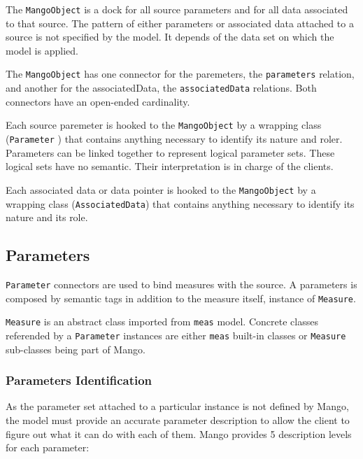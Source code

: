 \documentclass[11pt,a4paper]{ivoa}
\begin{document}
The \texttt{MangoObject} is a dock for all source parameters and for all data associated to that source.
The pattern of either parameters or associated data attached to a source is not specified by the model. It depends of the data set on which the model is applied.

The \texttt{MangoObject} has one connector for the paremeters,  the \texttt{parameters} relation, and another for the associatedData, the  \texttt{associatedData}  relations.
Both connectors have an open-ended cardinality.

Each source paremeter is hooked to the \texttt{MangoObject} by a wrapping class (\texttt{Parameter} ) that contains anything necessary to identify its nature and roler.
Parameters can be linked together to represent logical parameter sets. These logical sets have no semantic. Their interpretation is in charge  of the clients.

Each associated data or data pointer is hooked to the \texttt{MangoObject} by a wrapping class (\texttt{AssociatedData}) that contains anything necessary to identify its nature and its role.

\subsection{Parameters}

\texttt{Parameter}  connectors are used to bind measures with the source.
A parameters is composed  by semantic tags in addition to the measure itself, instance of \texttt{Measure}.

 \texttt{Measure} is an abstract class imported from \texttt{meas} model. 
Concrete classes referended by a \texttt{Parameter} instances are either \texttt{meas}  built-in classes or  \texttt{Measure} sub-classes being part of Mango.

\subsubsection{Parameters Identification}
As the parameter set  attached to a particular instance is not defined by Mango, the model must provide an accurate parameter description to allow the client to figure out what it can do with each of them.
Mango provides 5 description levels for each parameter:
\end{document}
